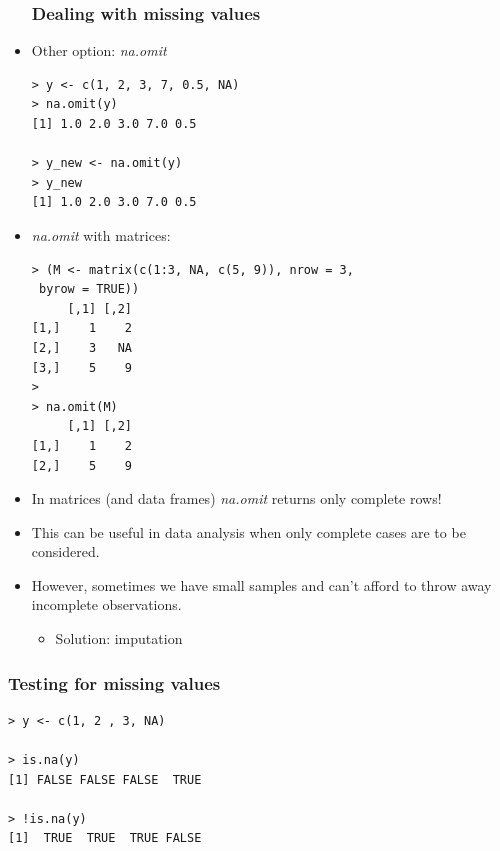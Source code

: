 \documentclass[xcolor=dvipsnames, xcolor=table]{beamer} %
\theoremstyle{mystyle}
\begin{document}
\begin{frame}[fragile]

\begin{itemize}
\frametitle{Dealing with missing values}
\item Other option: \textit{na.omit}

\begin{verbatim}
> y <- c(1, 2, 3, 7, 0.5, NA)
> na.omit(y)
[1] 1.0 2.0 3.0 7.0 0.5

> y_new <- na.omit(y)
> y_new
[1] 1.0 2.0 3.0 7.0 0.5
\end{verbatim}

\end{itemize}

\end{frame}

\begin{frame}[fragile]

\begin{itemize}
\frametitle{Dealing with missing values}
\item  \textit{na.omit} with matrices:

\begin{verbatim}
> (M <- matrix(c(1:3, NA, c(5, 9)), nrow = 3,
 byrow = TRUE))
     [,1] [,2]
[1,]    1    2
[2,]    3   NA
[3,]    5    9
> 
> na.omit(M)
     [,1] [,2]
[1,]    1    2
[2,]    5    9
\end{verbatim}

\end{itemize}

\end{frame}

\begin{frame}
\begin{itemize}
\frametitle{Dealing with missing values}
\item  In matrices (and data frames) \textit{na.omit} returns only complete rows!
\item This can be useful in data analysis when only complete cases are to be considered.
\item However, sometimes we have small samples and can't afford to throw away incomplete observations. 
\begin{itemize}
\item Solution: imputation
\end{itemize}
\end{itemize}
\end{frame}

\begin{frame}[fragile] %

\frametitle{Testing for missing values}


\begin{verbatim}
> y <- c(1, 2 , 3, NA)

> is.na(y)
[1] FALSE FALSE FALSE  TRUE

> !is.na(y)
[1]  TRUE  TRUE  TRUE FALSE
\end{verbatim}


\end{frame}
\end{document}
